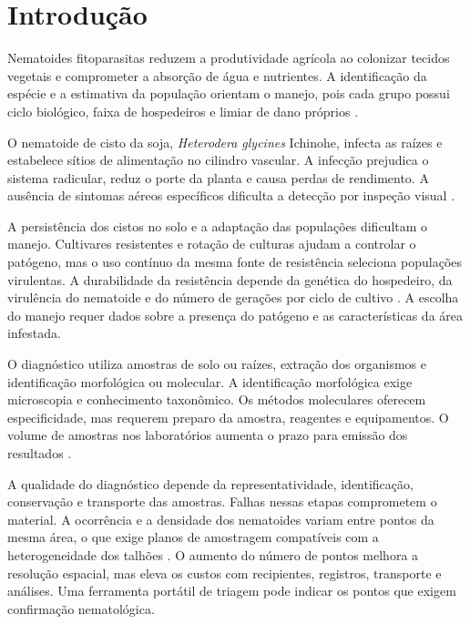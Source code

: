 
\section{Introdução}
\label{sec:introducao}

Nematoides fitoparasitas reduzem a produtividade agrícola ao colonizar tecidos vegetais e comprometer a absorção de água e nutrientes. A identificação da espécie e a estimativa da população orientam o manejo, pois cada grupo possui ciclo biológico, faixa de hospedeiros e limiar de dano próprios \cite{agarwal2023}.

O nematoide de cisto da soja, \textit{Heterodera glycines} Ichinohe, infecta as raízes e estabelece sítios de alimentação no cilindro vascular. A infecção prejudica o sistema radicular, reduz o porte da planta e causa perdas de rendimento. A ausência de sintomas aéreos específicos dificulta a detecção por inspeção visual \cite{he2023}.

A persistência dos cistos no solo e a adaptação das populações dificultam o manejo. Cultivares resistentes e rotação de culturas ajudam a controlar o patógeno, mas o uso contínuo da mesma fonte de resistência seleciona populações virulentas. A durabilidade da resistência depende da genética do hospedeiro, da virulência do nematoide e do número de gerações por ciclo de cultivo \cite{mccarville2024}. A escolha do manejo requer dados sobre a presença do patógeno e as características da área infestada.

O diagnóstico utiliza amostras de solo ou raízes, extração dos organismos e identificação morfológica ou molecular. A identificação morfológica exige microscopia e conhecimento taxonômico. Os métodos moleculares oferecem especificidade, mas requerem preparo da amostra, reagentes e equipamentos. O volume de amostras nos laboratórios aumenta o prazo para emissão dos resultados \cite{agarwal2023}.

A qualidade do diagnóstico depende da representatividade, identificação, conservação e transporte das amostras. Falhas nessas etapas comprometem o material. A ocorrência e a densidade dos nematoides variam entre pontos da mesma área, o que exige planos de amostragem compatíveis com a heterogeneidade dos talhões \cite{kessler2023}. O aumento do número de pontos melhora a resolução espacial, mas eleva os custos com recipientes, registros, transporte e análises. Uma ferramenta portátil de triagem pode indicar os pontos que exigem confirmação nematológica.

